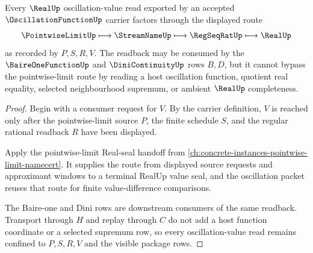 \begin{theorem}
\label{thm:oscillation-function-pointwise-readback}
Every $\RealUp$ oscillation-value read exported by an accepted $\OscillationFunctionUp$ carrier factors through the displayed route
$$
\PointwiseLimitUp \longmapsto \StreamNameUp \longmapsto \RegSeqRatUp \longmapsto \RealUp
$$
as recorded by $P,S,R,V$. The readback may be consumed by the $\BaireOneFunctionUp$ and $\DiniContinuityUp$ rows $B,D$, but it cannot bypass the pointwise-limit route by reading a host oscillation function, quotient real equality, selected neighbourhood supremum, or ambient $\RealUp$ completeness.
\end{theorem}
\begin{proof}
Begin with a consumer request for $V$. By the carrier definition, $V$ is reached only after the pointwise-limit source $P$, the finite schedule $S$, and the regular rational readback $R$ have been displayed.

Apply the pointwise-limit Real-seal handoff from \autoref{ch:concrete-instances-pointwise-limit-namecert}. It supplies the route from displayed source requests and approximant windows to a terminal RealUp value seal, and the oscillation packet reuses that route for finite value-difference comparisons.

The Baire-one and Dini rows are downstream consumers of the same readback. Transport through $H$ and replay through $C$ do not add a host function coordinate or a selected supremum row, so every oscillation-value read remains confined to $P,S,R,V$ and the visible package rows.
\end{proof}

